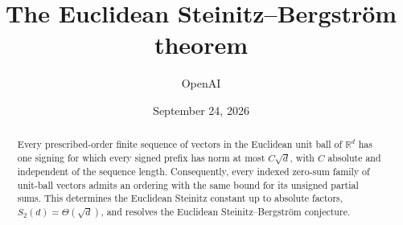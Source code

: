 \documentclass[11pt]{article}
\title{The Euclidean Steinitz--Bergstr\"om theorem}
\author{OpenAI}
\date{September 24, 2026}
\theoremstyle{definition}
\theoremstyle{remark}
\newcommand{\R}{\mathbb R}
\begin{document}
\maketitle
\begin{abstract}
Every prescribed-order finite sequence of vectors in the Euclidean unit
ball of $\R^d$ has one signing for which every signed prefix has norm at
most $C\sqrt d$, with $C$ absolute and independent of the sequence length.
Consequently, every indexed zero-sum family of unit-ball vectors admits an
ordering with the same bound for its unsigned partial sums. This determines
the Euclidean Steinitz constant up to absolute factors,
$S_2(d)=\Theta(\sqrt d)$, and resolves the Euclidean
Steinitz--Bergstr\"om conjecture.
\end{abstract}
{\small\tableofcontents}
\clearpage






\clearpage


\end{document}
